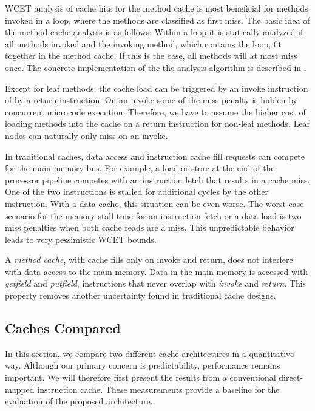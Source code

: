 WCET analysis of cache hits for the method cache is most beneficial
for methods invoked in a loop, where the methods are classified as
first miss. The basic idea of the method cache analysis is as
follows: Within a loop it is statically analyzed if all methods
invoked and the invoking method, which contains the loop, fit
together in the method cache. If this is the case, all methods will
at most miss once. The concrete implementation of the the analysis
algorithm is described in \cite{master:huber:2009}.

Except for leaf methods, the cache load can be triggered by an invoke
instruction of by a return instruction. On an invoke some of the miss
penalty is hidden by concurrent microcode execution. Therefore, we
have to assume the higher cost of loading methods into the cache on a
return instruction for non-leaf methods. Leaf nodes can naturally
only miss on an invoke.

In traditional caches, data access and instruction cache fill
requests can compete for the main memory bus. For example, a load or
store at the end of the processor pipeline competes with an
instruction fetch that results in a cache miss. One of the two
instructions is stalled for additional cycles by the other
instruction. With a data cache, this situation can be even worse.
The worst-case scenario for the memory stall time for an instruction
fetch or a data load is two miss penalties when both cache reads are
a miss. This unpredictable behavior leads to very pessimistic WCET
bounds.

A \emph{method cache}, with cache fills only on invoke and return,
does not interfere with data access to the main memory. Data in the
main memory is accessed with \emph{getfield} and \emph{putfield},
instructions that never overlap with \emph{invoke} and
\emph{return}. This property removes another uncertainty found in
traditional cache designs.


\subsection{Caches Compared}

In this section, we compare two different cache architectures in a
quantitative way. Although our primary concern is predictability,
performance remains important. We will therefore first present the
results from a conventional direct-mapped instruction cache. These
measurements provide a baseline for the evaluation of the proposed
architecture.

